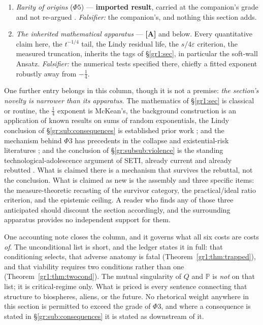 \documentclass[11pt]{article}
\numberwithin{equation}{section}
\theoremstyle{plain}
\theoremstyle{definition}
\theoremstyle{remark}
\newcommand{\PP}{\mathbb{P}}
\begin{document}
\begin{enumerate}[itemsep=2pt]
\item \emph{Rarity of origins} ($\Phi5$) --- \textbf{imported result},
carried at the companion's grade and not re-argued
\cite{Nexus, Ben26Found, Ben26Optimal}. \emph{Falsifier:} the
companion's, and nothing this section adds.

\item \emph{The inherited mathematical apparatus} --- \textbf{[A]} and
below. Every quantitative claim here, the $t^{-1/4}$ tail, the Lindy
residual life, the $s/4\varepsilon$ criterion, the measured truncation, inherits the tags of \S\ref{gr1:sec}, in
particular the soft-wall Ansatz. \emph{Falsifier:} the numerical tests
specified there, chiefly a fitted exponent robustly away from
$-\tfrac14$.
\end{enumerate}

\noindent One further entry belongs in this column, though it is not a
premise: \emph{the section's novelty is narrower than its apparatus}.
The mathematics of \S\ref{gr1:sec} is classical or routine, the
$\tfrac14$ exponent is McKean's, the background construction is an
application of known results on sums of random exponentials, the Lindy
conclusion of \S\ref{gr:sub:consequences} is established prior work
\cite{BC21,BG24,Kip20,Ord23}; and the mechanism behind $\Phi3$ has
precedents in the collapse and existential-risk literatures
\cite{Tainter88,Bostrom19,EF24}; and the conclusion of
\S\ref{gr:subsub:violence} is the standing technological-adolescence
argument of SETI, already current and already rebutted
\cite{Cooper19}. What is claimed there is a mechanism that survives the
rebuttal, not the conclusion. What is claimed as new is the assembly
and three specific items: the measure-theoretic recasting of the
survivor category, the practical/ideal ratio criterion, and the
epistemic ceiling. A reader who finds any of those three anticipated
should discount the section accordingly, and the surrounding apparatus
provides no independent support for them.

One accounting note closes the column, and it governs what all
six costs are costs \emph{of}. The unconditional list is short, and the
ledger states it in full: that conditioning selects, that adverse
anatomy is fatal (Theorem~\ref{gr1:thm:trapped}), and that viability
requires two conditions rather than one
(Theorem~\ref{gr1:thm:twocond}). The mutual singularity of $Q$ and
$\PP$ is \emph{not} on that list; it is critical-regime only. What is priced is every sentence connecting that structure to
biospheres, aliens, or the future. No rhetorical weight anywhere in this
section is permitted to exceed the grade of $\Phi3$, and where a
consequence is stated in \S\ref{gr:sub:consequences} it is stated as
downstream of it.
\end{document}
